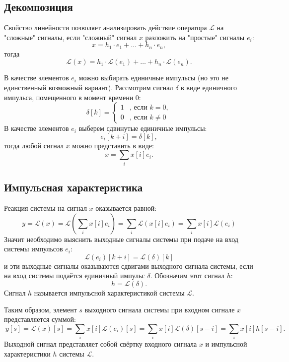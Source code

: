 \subsection{Декомпозиция}

Свойство линейности позволяет анализировать действие оператора $\mathcal{L}$ на "сложные"{} сигналы, если "сложный"{} сигнал $x$ разложить на "простые"{} сигналы $e_i$:
\[
    x = h_1 \cdot e_1 + \dots + h_n \cdot e_n ,
\]
тогда
\[
    \mathcal{L}(x) = h_1 \cdot \mathcal{L}(e_1) + \dots + h_n \cdot \mathcal{L}(e_n) .
\]

В качестве элементов $e_i$ можно выбирать единичные импульсы (но это не единственный возможный вариант). Рассмотрим сигнал $\delta$ в виде единичного импульса, помещенного в
момент времени 0:
\[
    \delta[k]
    = \left \{
    \begin{array}{rr}
        1 & \text{, если } k = 0 ,  \\
        0 & \text{, если } k \neq 0
    \end{array}
    \right .
\]
В качестве элементов $e_i$ выберем сдвинутые единичные импульсы:
\[
    e_i[k+i]
    = \delta[k] ,
\]
тогда любой сигнал $x$ можно представить в виде:
\[
    x
    = \sum_{i} x[i] e_i .
\]

\subsection{Импульсная характеристика}

Реакция системы на сигнал $x$ оказывается равной:
\[
    y
    = \mathcal{L}(x)
    = \mathcal{L} \left ( \sum_{i} x[i] e_i \right )
    = \sum_{i} \mathcal{L} \left ( x[i] e_i \right )
    = \sum_{i} x[i] \mathcal{L} \left ( e_i \right )
\]
Значит необходимо выяснить выходные сигналы системы при подаче на вход системы импульсов $e_i$:
\[
    \mathcal{L} \left ( e_i \right )[k+i] = \mathcal{L}(\delta)[k]
\]
и эти выходные сигналы оказываются сдвигами выходного сигнала системы, если на вход системы подаётся единичный импульс $\delta$. Обозначим этот сигнал $h$:
\[
    h = \mathcal{L}(\delta).
\]
Сигнал $h$ называется импульсной характеристикой системы $\mathcal{L}$.

Таким образом, элемент $s$ выходного сигнала системы при входном сигнале $x$ представляется суммой:
\begin{equation}
    ~\label{linear:impulse:convolution}
    y[s]
    = \mathcal{L}(x)[s]
    = \sum_{i} x[i] \mathcal{L} \left ( e_i \right )[s]
    = \sum_{i} x[i] \mathcal{L} \left ( \delta \right )[s-i]
    = \sum_{i} x[i] h[s-i] .
\end{equation}
Выходной сигнал представляет собой свёртку входного сигнала $x$ и импульсной характеристики $h$ системы $\mathcal{L}$.

